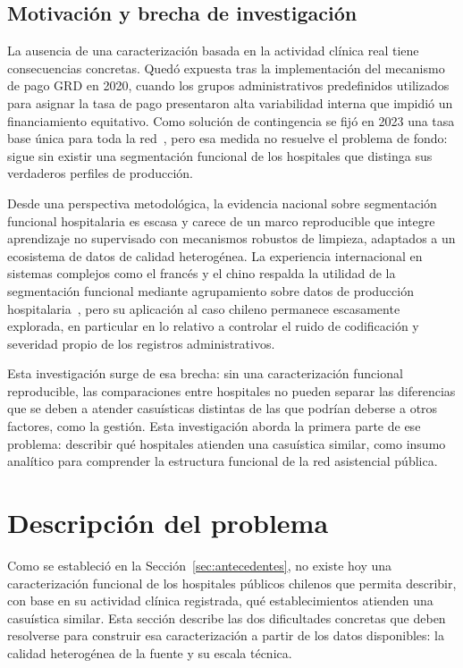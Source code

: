 \subsection{Motivación y brecha de investigación}
\label{sec:motivacion}

La ausencia de una caracterización basada en la actividad clínica real tiene
consecuencias concretas. Quedó expuesta tras la implementación del mecanismo de
pago GRD en 2020, cuando los grupos administrativos predefinidos utilizados
para asignar la tasa de pago presentaron alta variabilidad interna que impidió
un financiamiento equitativo. Como solución de contingencia se fijó en 2023 una
tasa base única para toda la red~\citep{Cid2024, FONASA2024}, pero esa medida no
resuelve el problema de fondo: sigue sin existir una segmentación funcional de
los hospitales que distinga sus verdaderos perfiles de producción.

Desde una perspectiva metodológica, la evidencia nacional sobre segmentación
funcional hospitalaria es escasa y carece de un marco reproducible que integre
aprendizaje no supervisado con mecanismos robustos de limpieza, adaptados a un
ecosistema de datos de calidad heterogénea. La experiencia internacional en
sistemas complejos como el francés y el chino respalda la utilidad de la
segmentación funcional mediante agrupamiento sobre datos de
producción hospitalaria~\citep{Chrusciel2021, Liu2025}, pero su aplicación al
caso chileno permanece escasamente explorada, en particular en lo relativo a
controlar el ruido de codificación y severidad propio de los registros
administrativos.

Esta investigación surge de esa brecha: sin una caracterización funcional
reproducible, las comparaciones entre hospitales no pueden separar las
diferencias que se deben a atender casuísticas distintas de las que podrían
deberse a otros factores, como la gestión. Esta investigación aborda la primera
parte de ese problema: describir qué hospitales atienden una casuística similar,
como insumo analítico para comprender la estructura funcional de la red
asistencial pública.

\section{Descripción del problema}
\label{sec:problema}

Como se estableció en la Sección~\ref{sec:antecedentes}, no existe hoy una
caracterización funcional de los hospitales públicos chilenos que permita
describir, con base en su actividad clínica registrada, qué establecimientos
atienden una casuística similar. Esta sección describe las dos dificultades
concretas que deben resolverse para construir esa caracterización a partir de
los datos disponibles: la calidad heterogénea de la fuente y su escala técnica.

